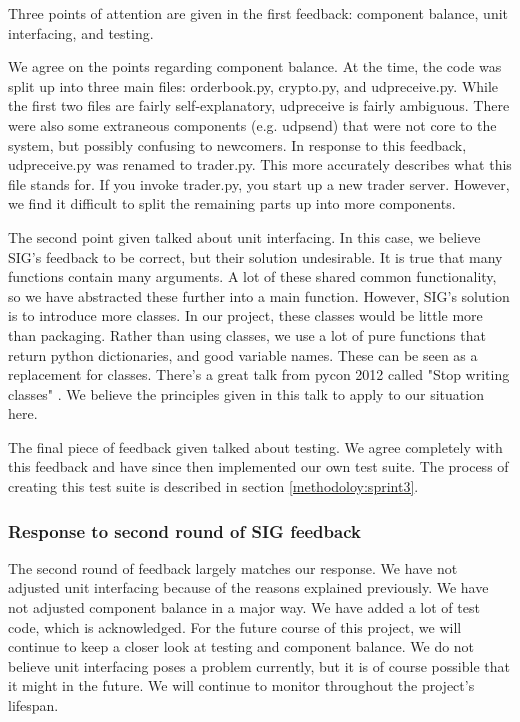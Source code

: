 Three points of attention are given in the first feedback: component balance, unit interfacing, and testing.

We agree on the points regarding component balance.
At the time, the code was split up into three main files: orderbook.py, crypto.py, and udpreceive.py.
While the first two files are fairly self-explanatory, udpreceive is fairly ambiguous.
There were also some extraneous components (e.g. udpsend) that were not core to the system, but possibly confusing to newcomers.
In response to this feedback, udpreceive.py was renamed to trader.py.
This more accurately describes what this file stands for.
If you invoke trader.py, you start up a new trader server.
However, we find it difficult to split the remaining parts up into more components.

The second point given talked about unit interfacing.
In this case, we believe SIG's feedback to be correct, but their solution undesirable.
It is true that many functions contain many arguments.
A lot of these shared common functionality, so we have abstracted these further into a main function.
However, SIG's solution is to introduce more classes.
In our project, these classes would be little more than packaging.
Rather than using classes, we use a lot of pure functions that return python dictionaries, and good variable names.
These can be seen as a replacement for classes.
There's a great talk from pycon 2012 called "Stop writing classes" \cite{noclassesvid}.
We believe the principles given in this talk to apply to our situation here.

The final piece of feedback given talked about testing.
We agree completely with this feedback and have since then implemented our own test suite.
The process of creating this test suite is described in section \ref{methodoloy:sprint3}.

\subsubsection{Response to second round of SIG feedback}
The second round of feedback largely matches our response.
We have not adjusted unit interfacing because of the reasons explained previously.
We have not adjusted component balance in a major way.
We have added a lot of test code, which is acknowledged.
For the future course of this project, we will continue to keep a closer look at testing and component balance.
We do not believe unit interfacing poses a problem currently, but it is of course possible that it might in the future.
We will continue to monitor throughout the project's lifespan.
